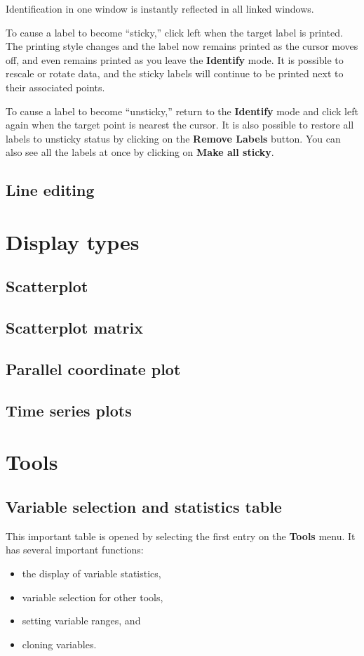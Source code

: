 \documentclass[11pt]{article}
\begin{document}
Identification in one window is instantly reflected in all linked windows.

To cause a label to become ``sticky,'' click left when the target label
is printed.  The printing style changes and the label now remains
printed as the cursor moves off, and even remains printed as you leave
the {\bf Identify} mode.  It is possible to rescale or rotate data, and
the sticky labels will continue to be printed next to their associated
points.

To cause a label to become ``unsticky,'' return to the {\bf Identify}
mode and click left again when the target point is nearest the cursor.
It is also possible to restore all labels to unsticky status by
clicking on the {\bf Remove Labels} button.  You can also see all the
labels at once by clicking on {\bf Make all sticky}. 

\subsection{Line editing}

\section {Display types}
\subsection{Scatterplot}
\subsection{Scatterplot matrix}
\subsection{Parallel coordinate plot}
\subsection{Time series plots}

\newpage
\section{Tools}
\subsection{Variable selection and statistics table}
\label{slbl:VarStats}

This important table is opened by selecting the first entry on the
{\bf Tools} menu.  It has several important functions:
\begin{itemize}
\itemsep 0em
\item the display of variable statistics,
\item variable selection for other tools,
\item setting variable ranges, and
\item cloning variables.
\end{itemize}
\end{document}
